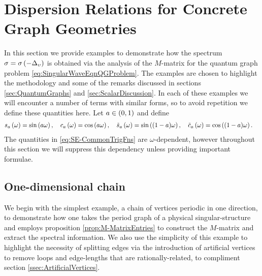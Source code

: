 \section{Dispersion Relations for Concrete Graph Geometries} \label{sec:ScalarExamples}
In this section we provide examples to demonstrate how the spectrum $\sigma=\sigma\left( -\Delta_{\upsilon} \right)$ is obtained via the analysis of the $M$-matrix for the quantum graph problem \eqref{eq:SingularWaveEqnQGProblem}.
The examples are chosen to highlight the methodology and some of the remarks discussed in sections \ref{sec:QuantumGraphs} and \ref{sec:ScalarDiscussion}.
In each of these examples we will encounter a number of terms with similar forms, so to avoid repetition we define these quantities here.
Let $a\in\left( 0,1 \right)$ and define
\begin{align} \label{eq:SE-CommonTrigFns}
	s_a\left( \omega \right) &= \sin\left( a\omega \right), \quad 
	c_a\left( \omega \right) = \cos\left( a\omega \right), \quad
	\tilde{s}_a\left( \omega \right) = \sin\left( (1-a)\omega \right), \quad 
	\tilde{c}_a\left( \omega \right) = \cos\left( (1-a)\omega \right).
\end{align}
The quantities in \eqref{eq:SE-CommonTrigFns} are $\omega$-dependent, however throughout this section we will suppress this dependency unless providing important formulae. 

\subsection{One-dimensional chain} \label{ssec:Example1DLoop}
We begin with the simplest example, a chain of vertices periodic in one direction, to demonstrate how one takes the period graph of a physical singular-structure and employs proposition \ref{prop:M-MatrixEntries} to construct the $M$-matrix and extract the spectral information.
We also use the simplicity of this example to highlight the necessity of splitting edges via the introduction of artificial vertices to remove loops and edge-lengths that are rationally-related, to compliment section \ref{ssec:ArtificialVertices}.

